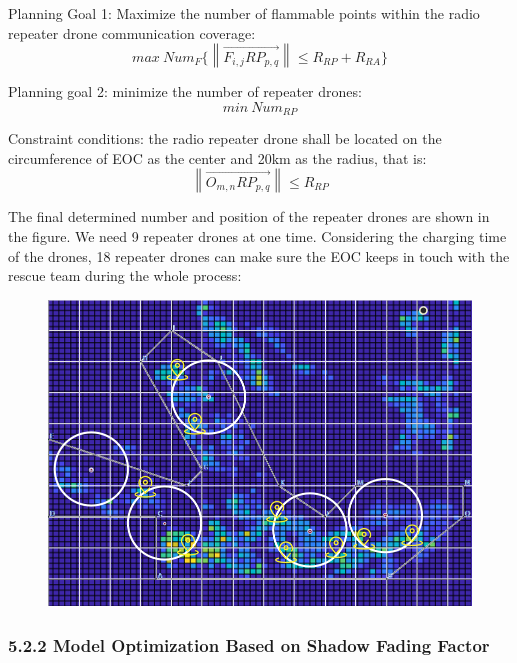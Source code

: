 \documentclass{mcmthesis}
\begin{document}
Planning Goal 1: Maximize the number of flammable points within the radio repeater drone communication coverage:
\begin{equation}
  max\ Num_F\{\left \| \overrightarrow{F_{i,j}RP_{p,q} }  \right \| \le R_{RP}+R_{RA}\}
\end{equation}


Planning goal 2: minimize the number of repeater drones:
\begin{equation}
min\ Num_{RP}
\end{equation}

Constraint conditions: the radio repeater drone shall be located on the circumference of EOC as the center and 20km as the radius, that is:
\begin{equation}
\left \| \overrightarrow{O_{m,n}RP_{p,q} }  \right\| \le R_{RP}
\end{equation}


The final determined number and position of the repeater drones are shown in the figure. We need 9 repeater drones at one time. Considering the charging time of the drones, 18 repeater drones can make sure the EOC keeps in touch with the rescue team during the whole process:

\begin{figure}[H]
  \centering
  \includegraphics[scale=0.4]{image/F.png}
  
\end{figure}


\subsubsection*{5.2.2 Model Optimization Based on Shadow Fading Factor}
\end{document}
